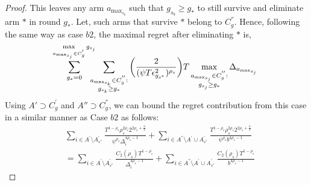 \begin{proof}
This leaves any arm $a_{\max_{s_{b}}}$ such that $g_{s_{b}}\geq g_{*}$ to still survive and eliminate arm ${*}$ in round $g_{*}$. Let, such arms that survive ${*}$ belong to $C_{g}^{''}$. Hence, following the same way as case $b2$,  the maximal regret after eliminating ${*}$ is,
 \begin{align*}
 \!\!\sum_{g_{*}=0}^{\max\limits_{a_{\max_{s_{j}}}\in C_{g}^{'}}g_{s_{j}}}\!\!\!\!\!\sum_{\substack{\scriptsize a_{\max_{s_{k}}}\in C_{g}^{''}: \\ g_{s_{k}} \geq g_{*}}}\bigg(\dfrac{2}{(\psi T\epsilon_{g_{s^{*}}}^{2})^{\rho_{s}}} \bigg)T\max_{\substack{a_{\max_{s_{j}}}\in C_{g}^{''}: \\ g_{s_{j}}\geq g_{*}}}{\Delta}_{a_{\max_{s_{j}}}}
 \end{align*}
Using $A'\supset C_{g}^{'}$ and $A''\supset C_{g}^{''}$, we can bound the regret contribution from this case in a similar manner as Case $b2$ as follows:
\begin{align*}
 &\!\!\sum_{i\in A^{'}\setminus A_{s^*}^{'}}\frac{T^{1-\rho_{s}}\rho_{s}^{2\rho_{s}}2^{2\rho_{s}+\frac{3}{2}}}{\psi^{\rho_{s}}\Delta_{i}^{4\rho_{s}-1}} 
 \!+\!\!\!\sum_{i\in A^{''}\setminus A^{'}\cup A_{s^*}^{'}}\!\!\!\!\frac{T^{1-\rho_{s}}\rho_{s}^{2\rho_{s}}2^{2\rho_{s}+\frac{3}{2}}}{\psi^{\rho_{s}}b^{4\rho_{s}-1}} \\
 & = \sum_{i\in A^{'}\setminus A_{s^*}^{'}}\frac{C_{2}(\rho_{s})T^{1-\rho_{s}}}{\Delta_{i}^{4\rho_{s}-1}} +\sum_{i\in A^{''}\setminus A^{'}\cup A_{s^*}^{'}}\frac{C_{2}(\rho_{s})T^{1-\rho_{s}}}{b^{4\rho_{s}-1}} 
\end{align*}


\end{proof}
